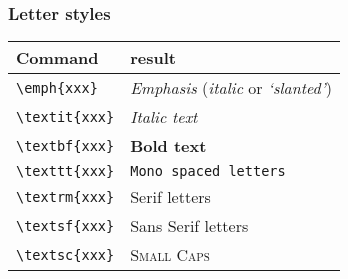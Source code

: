 \documentclass[aspectratio=169]{beamer}
\begin{document}
\begin{frame}[fragile]
 \frametitle{Letter styles}

 \begin{center}
   \begin{tabular}{ll}
     \toprule
     Command & result \\
     \midrule
     \verb?\emph{xxx}?   & \emph{Emphasis} (\textrm{\emph{italic}} or \textsf{\emph{`slanted'}})\\
     \verb?\textit{xxx}? & \textit{Italic text} \\
     \verb?\textbf{xxx}? & \textbf{Bold text} \\
     \verb?\texttt{xxx}? & \texttt{Mono spaced letters} \\
     \verb?\textrm{xxx}? & \textrm{Serif letters}  \\
     \verb?\textsf{xxx}? & \textsf{Sans Serif letters}  \\
     \verb?\textsc{xxx}? & \textsc{Small Caps} \\
   \end{tabular}
 \end{center}

\end{frame}
\end{document}
